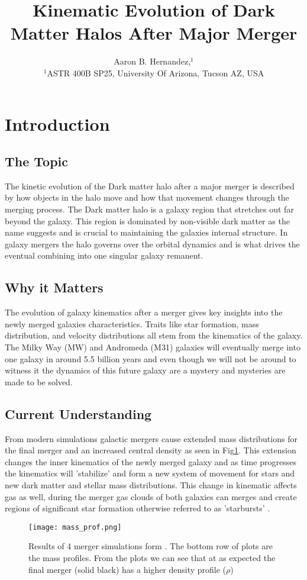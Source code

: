 \documentclass[fleqn,usenatbib]{mnras}
\title[Short title, max. 45 characters]{Kinematic Evolution of Dark Matter Halos After Major Merger}
\author[Aaron B. Hernandez et al.]{
Aaron B. Hernandez,$^{1}$
\\
$^{1}$ASTR 400B SP25, University Of Arizona, Tucson AZ, USA\\
}
\begin{document}
\label{firstpage}
\pagerange{\pageref{firstpage}--\pageref{lastpage}}
\maketitle

\section{Introduction}
\subsection{The Topic}
The kinetic evolution of the Dark matter halo after a major merger is described by how objects in the halo move and how that movement changes through the merging process. The Dark matter halo is a galaxy region that stretches out far beyond the galaxy. This region is dominated by non-visible dark matter as the name suggests and is crucial to maintaining the galaxies internal structure. In galaxy mergers the halo governs over the orbital dynamics and is what drives the eventual combining into one singular galaxy remanent.  
\subsection{Why it Matters}
The evolution of galaxy kinematics after a merger gives key insights into the newly merged galaxies characteristics. Traits like star formation, mass distribution, and velocity distributions all stem from the kinematics of the galaxy. The Milky Way (MW) and Andromeda (M31) galaxies will eventually merge into one galaxy in around 5.5 billion years and even though we will not be around to witness it the dynamics of this future galaxy are a mystery and mysteries are made to be solved. 

\subsection{Current Understanding}
From modern simulations galactic mergers cause extended mass distributions for the final merger and an increased central density \citep[e.g.][]{Drakos2019bMNRAS} as seen in Fig\ref{fig:fig 1}.  This extension changes the inner kinematics of the newly merged galaxy and as time progresses the kinematics will 'stabilize' and form a new system of movement for stars and new dark matter and stellar mass distributions. This change in kinematic affects gas as well, during the merger gas clouds of both galaxies can merges and create regions of significant star formation otherwise referred to as 'starbursts' \citep[e.g.][]{Ejdetjärn2025}.
\begin{figure}
	\texttt{[image: mass\_prof.png]}
    \caption{Results of 4 merger simulations form \cite{Drakos2019aMNRAS}. The bottom row of plots are the mass profiles. From the plots we can see that at as expected the final merger (solid black) has a higher density profile ($\rho$)}
    \label{fig:fig 1}
\end{figure}
\end{document}
